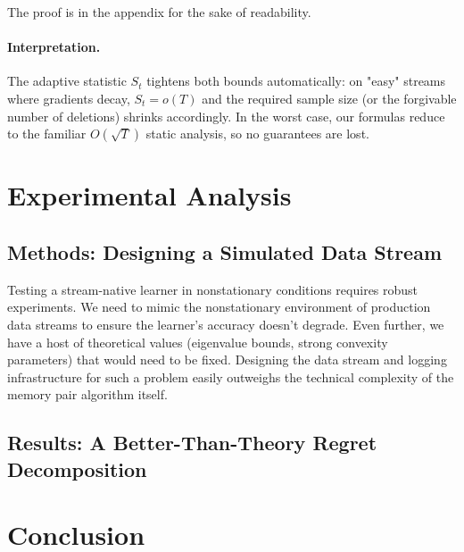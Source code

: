 \documentclass{article}
\theoremstyle{ssltheorem}
\begin{document}
The proof is in the appendix for the sake of readability.
\paragraph{Interpretation.}
The adaptive statistic $S_{t}$ tightens both bounds automatically:
on "easy" streams where gradients decay, $S_{t}=o(T)$ and the required
sample size (or the forgivable number of deletions) shrinks
accordingly.
In the worst case, our formulas reduce to the familiar
$O(\sqrt{T})$ static analysis, so no guarantees are lost.
\section{Experimental Analysis}

\subsection{Methods: Designing a Simulated Data Stream}

Testing a stream-native learner in nonstationary conditions requires robust experiments. We need to mimic the nonstationary environment of production data streams to ensure the learner's accuracy doesn't degrade. Even further, we have a host of theoretical values (eigenvalue bounds, strong convexity parameters) that would need to be fixed. Designing the data stream and logging infrastructure for such a problem easily outweighs the technical complexity of the memory pair algorithm itself.

\subsection{Results: A Better-Than-Theory Regret Decomposition}

\section{Conclusion}
\end{document}
